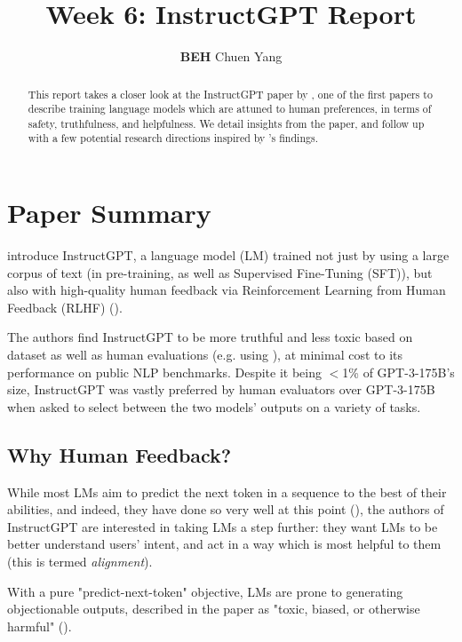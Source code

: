 \documentclass{article} %
\title{Week 6: InstructGPT Report}
\author{\textbf{BEH} Chuen Yang}
\begin{document}
\ifcolmsubmission
\linenumbers
\fi

\maketitle

\begin{abstract}
    This report takes a closer look at the InstructGPT paper by \cite{InstructGPT-2022},
    one of the first papers to describe training language models which
    are attuned to human preferences, in terms of safety, truthfulness, and helpfulness.
    We detail insights from the paper, and follow up with a few potential 
    research directions inspired by \cite{InstructGPT-2022}'s findings.
\end{abstract}

\section{Paper Summary}
\cite{InstructGPT-2022} introduce InstructGPT, a language model (LM) trained not just
by using a large corpus of text (in pre-training, as well as Supervised Fine-Tuning (SFT)), 
but also with high-quality human feedback via Reinforcement Learning from Human Feedback (RLHF) 
(\cite{Christiano-et-al-2017, Stiennon-et-al-2020}).

The authors find InstructGPT to be more truthful and less toxic
based on dataset as well as human evaluations (e.g. using \cite{Gehman-et-al-2020}),
at minimal cost to its performance on public NLP benchmarks.
Despite it being $<$1\% of GPT-3-175B's size, InstructGPT
was vastly preferred by human evaluators over GPT-3-175B 
when asked to select between the two models' outputs
on a variety of tasks.

\subsection{Why Human Feedback?}
While most LMs aim to predict the next token in a sequence
to the best of their abilities, and indeed, they have done so very well 
at this point (\cite{Radford-et-al-2019, Brown-et-al-2020}), the authors of InstructGPT
are interested in taking LMs a step further: they want LMs
to be better understand users' intent, and act in a way which is
most helpful to them (this is termed \textit{alignment}).

With a pure "predict-next-token" objective, LMs are prone
to generating objectionable outputs, described in the paper as 
"toxic, biased, or otherwise harmful" (\cite{InstructGPT-2022}).
\end{document}
